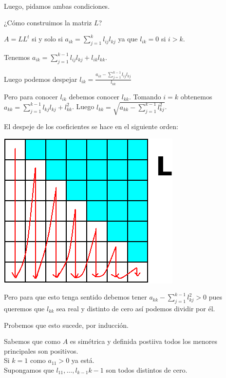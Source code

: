 \documentclass[10pt,a4paper,final]{report}
\begin{document}
Luego, pidamos ambas condiciones.

¿Cómo construimos la matriz $L$?


$A = LL^t$ si y solo si $a_{ik} = \displaystyle \sum_{j=1}^{k} l_{ij} l_{kj}$ ya que $l_{ik}= 0$ si $i>k$.

Tenemos $a_{ik} = \displaystyle \sum_{j=1}^{k-1} l_{ij} l_{kj} + l_{ik} l_{kk}$.

Luego podemos despejar $l_{ik} = \frac{a_{ik} - \displaystyle \sum_{j=1}^{k-1} l_{ij} l_{kj}}{l_{kk}}$

Pero para conocer $l_{ik}$ debemos conocer $l_{kk}$. Tomando $i=k$ obtenemos $a_{kk} = \displaystyle \sum_{j=1}^{k-1} l_{kj} l_{kj} + l_{kk}^2$. Luego $l_{kk} = \sqrt{a_{kk} - \displaystyle \sum_{j=1}^{k-1} l_{kj}^2}$.

El despeje de los coeficientes se hace en el siguiente orden:

\includegraphics[scale=1]{cholesky.png}


Pero para que esto tenga sentido debemos tener $a_{kk} - \displaystyle \sum_{j=1}^{k-1} l_{kj}^2>0$ pues queremos que $l_{kk}$ sea real y distinto de cero así podemos dividir por él. \bigskip


Probemos que esto sucede, por inducción.

Sabemos que como $A$ es simétrica y definida postiiva todos los menores principales son positivos.\\

Si $k=1$ como $a_{11}>0$ ya está.\\

Supongamos que $l_{11},...,l_{k-1}{k-1}$ son todos distintos de cero.
\end{document}
